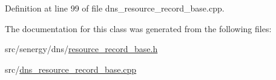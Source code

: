 Definition at line 99 of file dns\-\_\-resource\-\_\-record\-\_\-base.\-cpp.



The documentation for this class was generated from the following files\-:\begin{DoxyCompactItemize}
\item 
src/senergy/dns/\hyperlink{resource__record__base_8h}{resource\-\_\-record\-\_\-base.\-h}\item 
src/\hyperlink{dns__resource__record__base_8cpp}{dns\-\_\-resource\-\_\-record\-\_\-base.\-cpp}\end{DoxyCompactItemize}
